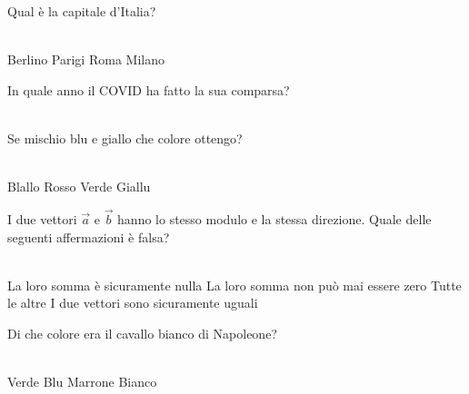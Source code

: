 \documentclass[a4paper,11pt]{exam}
\begin{document}
        \begin{center} 
        \end{center}
\begin{questions}

    
\question Qual è la capitale d’Italia?\\\
\begin{oneparchoices}
  \choice Berlino
  \choice Parigi
  \choice Roma
  \choice Milano
\end{oneparchoices}

    
\question In quale anno il COVID ha fatto la sua comparsa?\\\
\begin{oneparchoices}
  \choice 2019
\end{oneparchoices}

    
\question Se mischio blu e giallo che colore ottengo?\\\
\begin{oneparchoices}
  \choice Blallo
  \choice Rosso
  \choice Verde
  \choice Giallu
\end{oneparchoices}

    
\question I due vettori $\vec{a}$ e $\vec{b}$ hanno lo stesso modulo e la stessa direzione. Quale delle seguenti affermazioni è falsa?\\\
\begin{oneparchoices}
  \choice La loro somma è sicuramente nulla
  \choice La loro somma non può mai essere zero
  \choice Tutte le altre
  \choice I due vettori sono sicuramente uguali
\end{oneparchoices}

    
\question Di che colore era il cavallo bianco di Napoleone?\\\
\begin{oneparchoices}
  \choice Verde
  \choice Blu 
  \choice Marrone
  \choice Bianco
\end{oneparchoices}


\end{questions}
\end{document}
